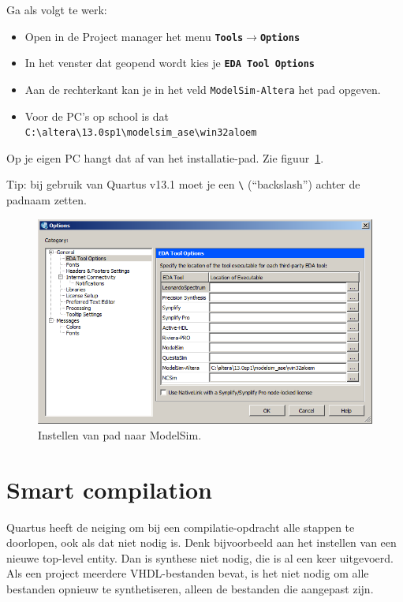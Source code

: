 \documentclass[a4paper,12pt,fleqn,twoside]{book}
\def\tutpicscale{0.455}
\newcommand{\menu}[1]{\texttt{\textbf{#1}}}
\newcommand{\naam}[1]{\texttt{#1}}
\def\pijl{$\rightarrow$}%
\begin{document}
Ga als volgt te werk:

\begin{itemize}\itemsep-1pt
\item Open in de Project manager het menu \menu{Tools\pijl{}Options}
\item In het venster dat geopend wordt kies je \menu{EDA Tool Options}
\item Aan de rechterkant kan je in het veld \naam{ModelSim-Altera} het pad opgeven.
\item Voor de PC's op school is dat \lstinline|C:\altera\13.0sp1\modelsim_ase\win32aloem|
\end{itemize}

Op je eigen PC hangt dat af van het installatie-pad.
 Zie
figuur~\ref{fig:212modelsimpath2}.

Tip: bij gebruik van Quartus v13.1 moet je een \lstinline|\| (``backslash'')
achter de padnaam zetten.

\begin{figure}[H]
\centering
\includegraphics[scale=\tutpicscale]{212modelsimpath2.png}
\caption{Instellen van pad naar ModelSim.}
\label{fig:212modelsimpath2}
\end{figure}


\section{Smart compilation}
\label{sec:smartcompilation}
Quartus heeft de neiging om bij een compilatie-opdracht alle stappen te
doorlopen, ook als dat niet nodig is. Denk bijvoorbeeld aan het instellen van
een nieuwe top-level entity. Dan is synthese niet nodig, die is al een keer
uitgevoerd. Als een project meerdere VHDL-bestanden bevat, is het niet nodig
om alle bestanden opnieuw te synthetiseren, alleen de bestanden die aangepast
zijn.
\end{document}
